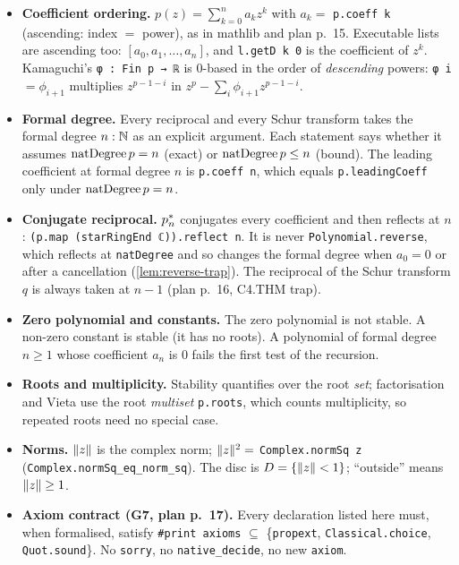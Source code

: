 \begin{itemize}
\item \textbf{Coefficient ordering.} $p(z)=\sum_{k=0}^{n} a_k z^k$ with
  $a_k = $ \texttt{p.coeff k} (ascending: index $=$ power), as in mathlib and
  plan p.~15. Executable lists are ascending too: $[a_0,a_1,\ldots,a_n]$, and
  \texttt{l.getD k 0} is the coefficient of $z^k$. Kamaguchi's
  \texttt{φ : Fin p → ℝ} is 0-based in the order of \emph{descending} powers:
  \texttt{φ i} $=\phi_{i+1}$ multiplies $z^{p-1-i}$ in
  $z^p-\sum_i \phi_{i+1}z^{p-1-i}$.
\item \textbf{Formal degree.} Every reciprocal and every Schur transform takes
  the formal degree $n:\N$ as an explicit argument. Each statement says whether
  it assumes $\natdeg\, p = n$ (exact) or $\natdeg\, p\le n$ (bound). The
  leading coefficient at formal degree $n$ is \texttt{p.coeff n}, which equals
  \texttt{p.leadingCoeff} only under $\natdeg\,p=n$.
\item \textbf{Conjugate reciprocal.} $\crec{n}{p}$ conjugates every coefficient
  and then reflects at $n$: \texttt{(p.map (starRingEnd ℂ)).reflect n}. It is
  never \texttt{Polynomial.reverse}, which reflects at \texttt{natDegree} and so
  changes the formal degree when $a_0=0$ or after a cancellation
  (\ref{lem:reverse-trap}). The reciprocal of the Schur transform $q$ is always
  taken at $n-1$ (plan p.~16, C4.THM trap).
\item \textbf{Zero polynomial and constants.} The zero polynomial is not stable.
  A non-zero constant is stable (it has no roots). A polynomial of formal degree
  $n\ge 1$ whose coefficient $a_n$ is $0$ fails the first test of the recursion.
\item \textbf{Roots and multiplicity.} Stability quantifies over the root
  \emph{set}; factorisation and Vieta use the root \emph{multiset}
  \texttt{p.roots}, which counts multiplicity, so repeated roots need no special
  case.
\item \textbf{Norms.} $\nm{z}$ is the complex norm; $\nm{z}^2 =$
  \texttt{Complex.normSq z} (\texttt{Complex.normSq\_eq\_norm\_sq}). The disc is
  $D=\{\nm{z}<1\}$; ``outside'' means $\nm{z}\ge 1$.
\item \textbf{Axiom contract (G7, plan p.~17).} Every declaration listed here
  must, when formalised, satisfy \texttt{\#print axioms} $\subseteq$
  \{\texttt{propext}, \texttt{Classical.choice}, \texttt{Quot.sound}\}. No
  \texttt{sorry}, no \texttt{native\_decide}, no new \texttt{axiom}.
\end{itemize}

